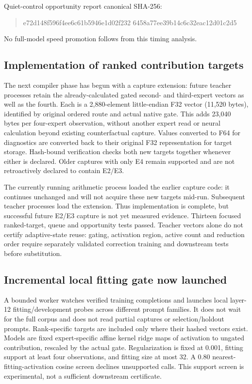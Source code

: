 Quiet-control opportunity report canonical SHA-256:
\begin{quote}\ttfamily\small
e72d148f596f4ee6c61b5946e1d02f232\allowbreak
6458a77ee39b14c6c32eac12d01c2d5
\end{quote}
No full-model speed promotion follows from this timing analysis.

\subsection{Implementation of ranked contribution targets}
The next compiler phase has begun with a capture extension: future teacher
processes retain the already-calculated gated second- and third-expert vectors
as well as the fourth. Each is a 2,880-element little-endian F32 vector
(11,520 bytes), identified by original ordered route and actual native gate.
This adds 23,040 bytes per four-expert observation, without another expert
read or neural calculation beyond existing counterfactual capture. Values
converted to F64 for diagnostics are converted back to their original F32
representation for target storage. Hash-bound verification checks both new
targets together whenever either is declared. Older captures with only E4
remain supported and are not retroactively declared to contain E2/E3.

The currently running arithmetic process loaded the earlier capture code:
it continues unchanged and will not acquire these new targets mid-run.
Subsequent teacher processes load the extension. Thus implementation is
complete, but successful future E2/E3 capture is not yet measured evidence.
Thirteen focused ranked-target, queue and opportunity tests passed.
Teacher vectors alone do not certify adaptive-state reuse: gating,
activation region, active count and reduction order require separately
validated correction training and downstream tests before substitution.

\subsection{Incremental local fitting gate now launched}
A bounded worker watches verified training completions and launches local
layer-12 fitting/development probes across different prompt families. It
does not wait for the full corpus and does not read partial captures or
selection/holdout prompts. Rank-specific targets are included only where
their hashed vectors exist. Models are fixed expert-specific affine kernel
ridge maps of activation to ungated contribution, rescaled by the actual
gate. Regularization is fixed at 0.001, fitting support at least four
observations, and fitting size at most 32. A 0.80 nearest-fitting-activation
cosine screen declines unsupported calls. This support screen is experimental,
not a sufficient downstream certificate.

